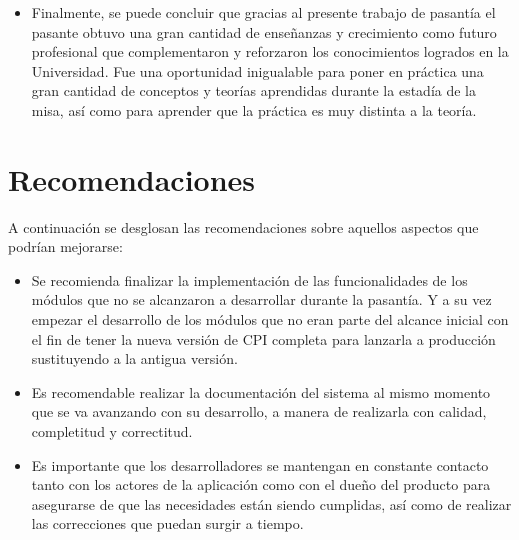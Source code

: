 \begin{itemize}
	\item Finalmente, se puede concluir que gracias al presente trabajo de pasantía el pasante obtuvo una gran cantidad de enseñanzas y crecimiento como futuro profesional que complementaron y reforzaron los conocimientos logrados en la Universidad. Fue una oportunidad inigualable para poner en práctica una gran cantidad de conceptos y teorías aprendidas durante la estadía de la misa, así como para aprender que la práctica es muy distinta a la teoría.
\end{itemize}

\section{Recomendaciones}
A continuación se desglosan las recomendaciones sobre aquellos aspectos que podrían mejorarse:
\begin{itemize}
	\item Se recomienda finalizar la implementación de las funcionalidades de los módulos que no se alcanzaron a desarrollar durante la pasantía. Y a su vez empezar el desarrollo de los módulos que no eran parte del alcance inicial con el fin de tener la nueva versión de CPI completa para lanzarla a producción sustituyendo a la antigua versión.
 	\item Es recomendable realizar la documentación del sistema al mismo momento que se va avanzando con su desarrollo, a manera de realizarla con calidad, completitud y correctitud.
	\item Es importante que los desarrolladores se mantengan en constante contacto tanto con los actores de la aplicación como con el dueño del producto para asegurarse de que las necesidades están siendo cumplidas, así como de realizar las correcciones que puedan surgir a tiempo.
\end{itemize}
